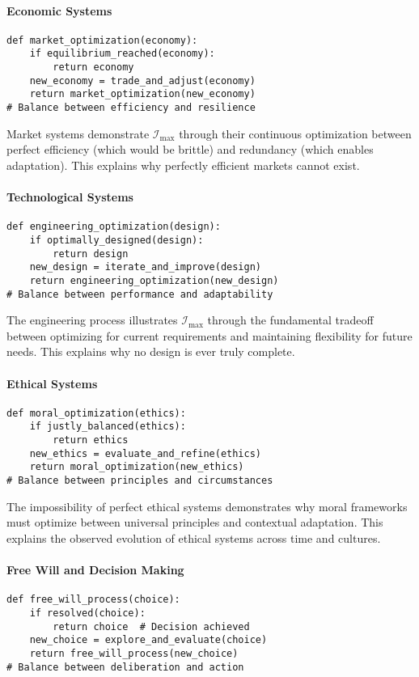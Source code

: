\documentclass[12pt]{article}
\begin{document}
\paragraph{Economic Systems}
\begin{verbatim}
def market_optimization(economy):
    if equilibrium_reached(economy):
        return economy
    new_economy = trade_and_adjust(economy)
    return market_optimization(new_economy)
# Balance between efficiency and resilience
\end{verbatim}

Market systems demonstrate $\mathcal{I}_{\text{max}}$ through their continuous optimization between perfect efficiency (which would be brittle) and redundancy (which enables adaptation). This explains why perfectly efficient markets cannot exist.

\paragraph{Technological Systems}
\begin{verbatim}
def engineering_optimization(design):
    if optimally_designed(design):
        return design
    new_design = iterate_and_improve(design)
    return engineering_optimization(new_design)
# Balance between performance and adaptability
\end{verbatim}

The engineering process illustrates $\mathcal{I}_{\text{max}}$ through the fundamental tradeoff between optimizing for current requirements and maintaining flexibility for future needs. This explains why no design is ever truly complete.

\paragraph{Ethical Systems}
\begin{verbatim}
def moral_optimization(ethics):
    if justly_balanced(ethics):
        return ethics
    new_ethics = evaluate_and_refine(ethics)
    return moral_optimization(new_ethics)
# Balance between principles and circumstances
\end{verbatim}

The impossibility of perfect ethical systems demonstrates why moral frameworks must optimize between universal principles and contextual adaptation. This explains the observed evolution of ethical systems across time and cultures.

\paragraph{Free Will and Decision Making}
\begin{verbatim}
def free_will_process(choice):
    if resolved(choice):
        return choice  # Decision achieved
    new_choice = explore_and_evaluate(choice)
    return free_will_process(new_choice)
# Balance between deliberation and action
\end{verbatim}
\end{document}

